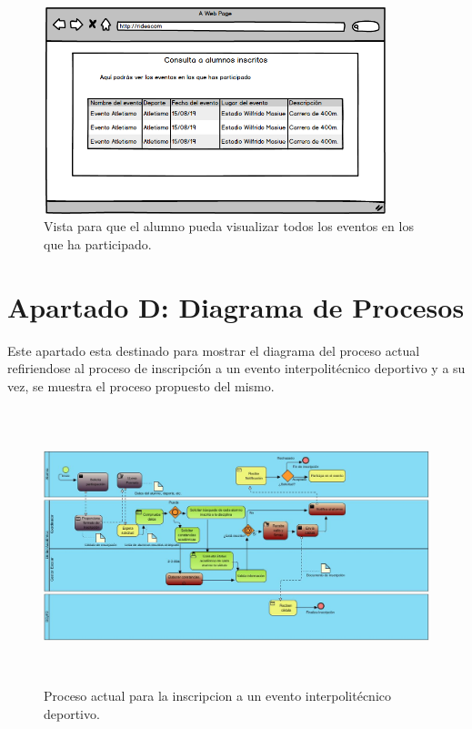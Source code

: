 		\begin{figure} [hbt!]
			\centering
			\includegraphics[width=10cm, height=6cm]{Imagenes/Nuevos/P21_Historial}
			\caption{Vista para que el alumno pueda visualizar todos los eventos en los que ha participado.}
			\label{historial}
		\end{figure}

	\chapter{Apartado D: Diagrama de Procesos}	
		\noindent Este apartado esta destinado para mostrar el diagrama del proceso actual refiriendose al proceso de inscripción a un evento interpolitécnico deportivo y a su vez, se muestra el proceso propuesto del mismo.
		
		\begin{figure}[hbt!]
			\centering
			\includegraphics[width=16cm, height=8cm]{Imagenes/Disenos/ProcesoInscripcionActual.jpg}
			\caption{Proceso actual para la inscripcion a un evento interpolitécnico deportivo.}
			\label{ProcesoInscripcionActual}
		\end{figure}
	\pagebreak
	
